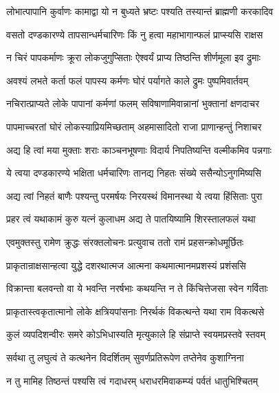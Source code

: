 \twolineshloka
{लोभात्पापानि कुर्वाणः कामाद्वा यो न बुध्यते}
{भ्रष्टः पश्यति तस्यान्तं ब्राह्मणी करकादिव} %

\twolineshloka
{वसतो दण्डकारण्ये तापसान्धर्मचारिणः}
{किं नु हत्वा महाभागान्फलं प्राप्स्यसि राक्षस} %

\twolineshloka
{न चिरं पापकर्माणः क्रूरा लोकजुगुप्सिताः}
{ऐश्वर्यं प्राप्य तिष्ठन्ति शीर्णमूला इव द्रुमाः} %

\twolineshloka
{अवश्यं लभते कर्ता फलं पापस्य कर्मणः}
{घोरं पर्यागते काले द्रुमः पुष्पमिवार्तवम्} %

\twolineshloka
{नचिरात्प्राप्यते लोके पापानां कर्मणां फलम्}
{सविषाणामिवान्नानां भुक्तानां क्षणदाचर} %

\twolineshloka
{पापमाच्चरतां घोरं लोकस्याप्रियमिच्छताम्}
{अहमासादितो राजा प्राणान्हन्तुं निशाचर} %

\twolineshloka
{अद्य हि त्वां मया मुक्ताः शराः काञ्चनभूषणाः}
{विदार्य निपतिष्यन्ति वल्मीकमिव पन्नगाः} %

\twolineshloka
{ये त्वया दण्डकारण्ये भक्षिता धर्मचारिणः}
{तानद्य निहतः संख्ये ससैन्योऽनुगमिष्यसि} %

\twolineshloka
{अद्य त्वां निहतं बाणैः पश्यन्तु परमर्षयः}
{निरयस्थं विमानस्था ये त्वया हिंसिताः पुरा} %

\twolineshloka
{प्रहर त्वं यथाकामं कुरु यत्नं कुलाधम}
{अद्य ते पातयिष्यामि शिरस्तालफलं यथा} %

\twolineshloka
{एवमुक्तस्तु रामेण क्रुद्धः संरक्तलोचनः}
{प्रत्युवाच ततो रामं प्रहसन्क्रोधमूर्छितः} %

\twolineshloka
{प्राकृतान्राक्षसान्हत्वा युद्धे दशरथात्मज}
{आत्मना कथमात्मानमप्रशस्यं प्रशंससि} %

\twolineshloka
{विक्रान्ता बलवन्तो वा ये भवन्ति नरर्षभाः}
{कथयन्ति न ते किंचित्तेजसा स्वेन गर्विताः} %

\twolineshloka
{प्राकृतास्त्वकृतात्मानो लोके क्षत्रियपांसनाः}
{निरर्थकं विकत्थन्ते यथा राम विकत्थसे} %

\twolineshloka
{कुलं व्यपदिशन्वीरः समरे कोऽभिधास्यति}
{मृत्युकाले हि संप्राप्ते स्वयमप्रस्तवे स्तवम्} %

\twolineshloka
{सर्वथा तु लघुत्वं ते कत्थनेन विदर्शितम्}
{सुवर्णप्रतिरूपेण तप्तेनेव कुशाग्निना} %

\twolineshloka
{न तु मामिह तिष्ठन्तं पश्यसि त्वं गदाधरम्}
{धराधरमिवाकम्प्यं पर्वतं धातुभिश्चितम्} %

